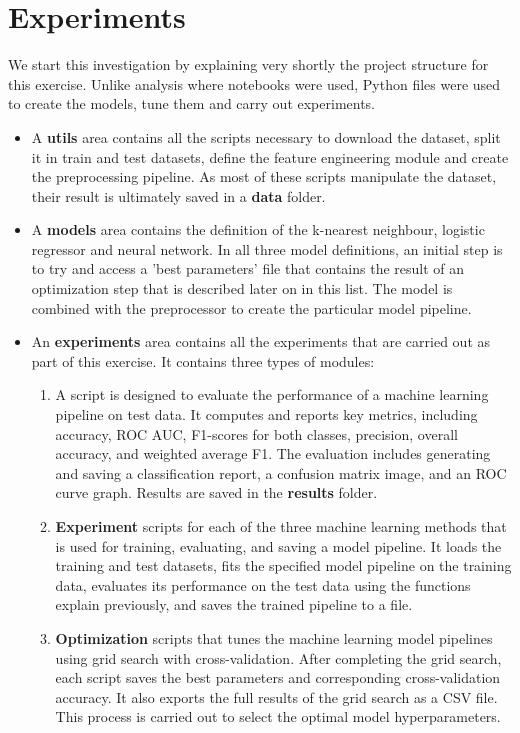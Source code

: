 
\section{Experiments}
\label{secn:experiments}

We start this investigation by explaining very shortly the project structure for this exercise. Unlike analysis where notebooks were used, Python files were used to create the models, tune them and carry out experiments. 


\begin{itemize}
	\item A \textbf{utils} area contains all the scripts necessary to download the dataset, split it in train and test datasets, define the feature engineering module and create the preprocessing pipeline. As most of these scripts manipulate the dataset, their result is ultimately saved in a \textbf{data} folder.
	
	\item A \textbf{models} area contains the definition of the k-nearest neighbour, logistic regressor and neural network. In all three model definitions, an initial step is to try and access a 'best parameters' file that contains the result of an optimization step that is described later on in this list. The model is combined with the preprocessor  to create the particular model pipeline.
	
	\item An \textbf{experiments} area contains all the experiments that are carried out as part of this exercise. It contains three types of modules:
	
	\begin{enumerate}
		\item A script is designed to evaluate the performance of a machine learning pipeline on test data. It computes and reports key metrics, including accuracy, ROC AUC, F1-scores for both  classes, precision, overall accuracy, and weighted average F1. The evaluation includes generating and saving a classification report, a confusion matrix image, and an ROC curve graph. Results are saved in the \textbf{results} folder.
		
		\item \textbf{Experiment} scripts for each of the three machine learning methods that is used for training, evaluating, and saving a model pipeline. It loads the training and test datasets, fits the specified model pipeline on the training data, evaluates its performance on the test data using the functions explain previously, and saves the trained pipeline to a file.
		
		\item \textbf{Optimization} scripts that tunes the machine learning model pipelines using grid search with cross-validation. After completing the grid search, each script saves the best parameters and corresponding cross-validation accuracy. It also exports the full results of the grid search as a CSV file. This process is carried out to select the optimal model hyperparameters.
	\end{enumerate}
\end{itemize}



